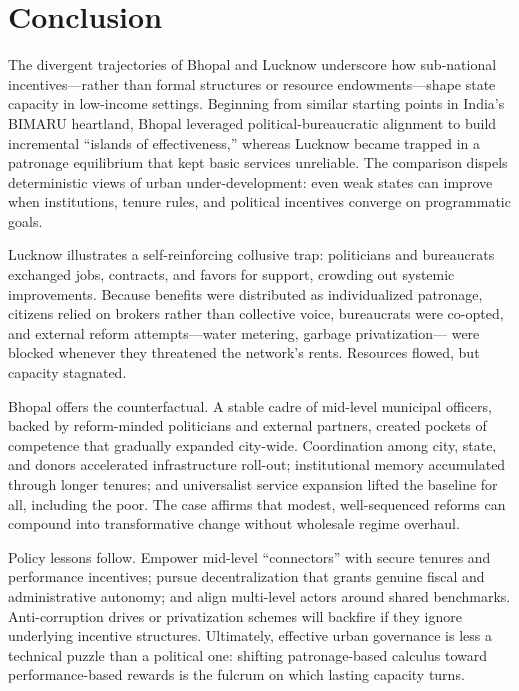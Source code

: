 \section{Conclusion}

The divergent trajectories of Bhopal and Lucknow underscore how sub-national incentives—rather than formal structures or resource endowments—shape state capacity in low-income settings.
Beginning from similar starting points in India's BIMARU heartland, Bhopal leveraged political-bureaucratic alignment to build incremental ``islands of effectiveness,'' whereas Lucknow became trapped in a patronage equilibrium that kept basic services unreliable. The comparison dispels deterministic views of urban under-development: even weak states can improve when institutions, tenure rules, and political incentives converge on programmatic goals.

Lucknow illustrates a self-reinforcing collusive trap: politicians and bureaucrats exchanged jobs, contracts, and favors for support, crowding out systemic improvements. Because benefits were distributed as individualized patronage, citizens relied on brokers rather than collective voice, bureaucrats were co-opted, and external reform attempts—water metering, garbage privatization— were blocked whenever they threatened the network's rents. Resources flowed, but capacity stagnated.

Bhopal offers the counterfactual. A stable cadre of mid-level municipal officers, backed by reform-minded politicians and external partners, created pockets of competence that gradually expanded city-wide. Coordination among city, state, and donors accelerated infrastructure roll-out; institutional memory accumulated through longer tenures; and universalist service expansion lifted the baseline for all, including the poor. The case affirms that modest, well-sequenced reforms can compound into transformative change without wholesale regime overhaul.

Policy lessons follow. Empower mid-level ``connectors'' with secure tenures and performance incentives; pursue decentralization that grants genuine fiscal and administrative autonomy; and align multi-level actors around shared benchmarks. Anti-corruption drives or privatization schemes will backfire if they ignore underlying incentive structures. Ultimately, effective urban governance is less a technical puzzle than a political one: shifting patronage-based calculus toward performance-based rewards is the fulcrum on which lasting capacity turns.

